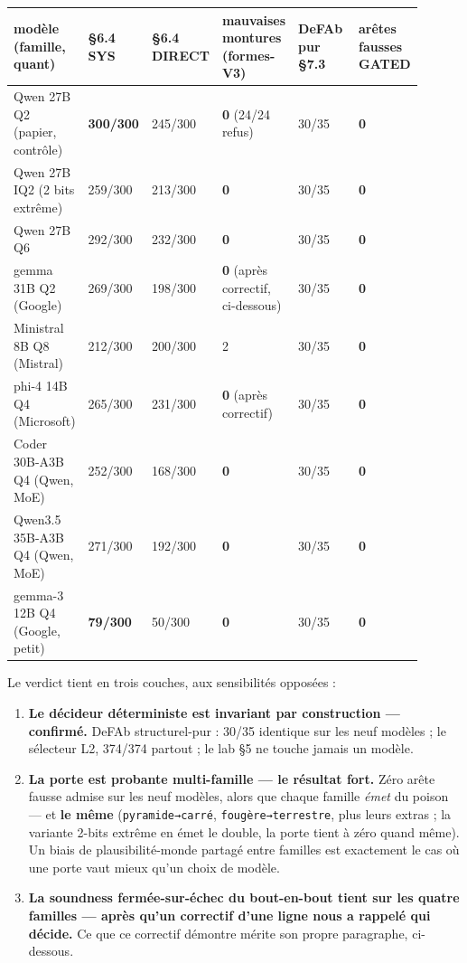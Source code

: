 \documentclass[11pt]{article}
\begin{document}
\begin{center}\small\begin{tabular}{p{0.15\linewidth}p{0.15\linewidth}p{0.15\linewidth}p{0.15\linewidth}p{0.15\linewidth}p{0.15\linewidth}}\toprule
modèle (famille, quant) & §6.4 SYS & §6.4 DIRECT & mauvaises montures (formes-V3) & DeFAb pur §7.3 & arêtes fausses GATED \\ \midrule
Qwen 27B Q2 (papier, contrôle) & \textbf{300/300} & 245/300 & \textbf{0} (24/24 refus) & 30/35 & \textbf{0} \\
Qwen 27B IQ2 (2 bits extrême) & 259/300 & 213/300 & \textbf{0} & 30/35 & \textbf{0} \\
Qwen 27B Q6 & 292/300 & 232/300 & \textbf{0} & 30/35 & \textbf{0} \\
gemma 31B Q2 (Google) & 269/300 & 198/300 & \textbf{0} (après correctif, ci-dessous) & 30/35 & \textbf{0} \\
Ministral 8B Q8 (Mistral) & 212/300 & 200/300 & 2 & 30/35 & \textbf{0} \\
phi-4 14B Q4 (Microsoft) & 265/300 & 231/300 & \textbf{0} (après correctif) & 30/35 & \textbf{0} \\
Coder 30B-A3B Q4 (Qwen, MoE) & 252/300 & 168/300 & \textbf{0} & 30/35 & \textbf{0} \\
Qwen3.5 35B-A3B Q4 (Qwen, MoE) & 271/300 & 192/300 & \textbf{0} & 30/35 & \textbf{0} \\
gemma-3 12B Q4 (Google, petit) & \textbf{79/300} & 50/300 & \textbf{0} & 30/35 & \textbf{0} \\
\bottomrule\end{tabular}\end{center}

Le verdict tient en trois couches, aux sensibilités opposées :

\begin{enumerate}
\item \textbf{Le décideur déterministe est invariant par construction — confirmé.} DeFAb structurel-pur : 30/35 identique sur les neuf modèles ; le sélecteur L2, 374/374 partout ; le lab §5 ne touche jamais un modèle.
\item \textbf{La porte est probante multi-famille — le résultat fort.} Zéro arête fausse admise sur les neuf modèles, alors que chaque famille \emph{émet} du poison — et \textbf{le même} (\texttt{pyramide→carré}, \texttt{fougère→terrestre}, plus leurs extras ; la variante 2-bits extrême en émet le double, la porte tient à zéro quand même). Un biais de plausibilité-monde partagé entre familles est exactement le cas où une porte vaut mieux qu'un choix de modèle.
\item \textbf{La soundness fermée-sur-échec du bout-en-bout tient sur les quatre familles — après qu'un correctif d'une ligne nous a rappelé qui décide.} Ce que ce correctif démontre mérite son propre paragraphe, ci-dessous.
\end{enumerate}
\end{document}

